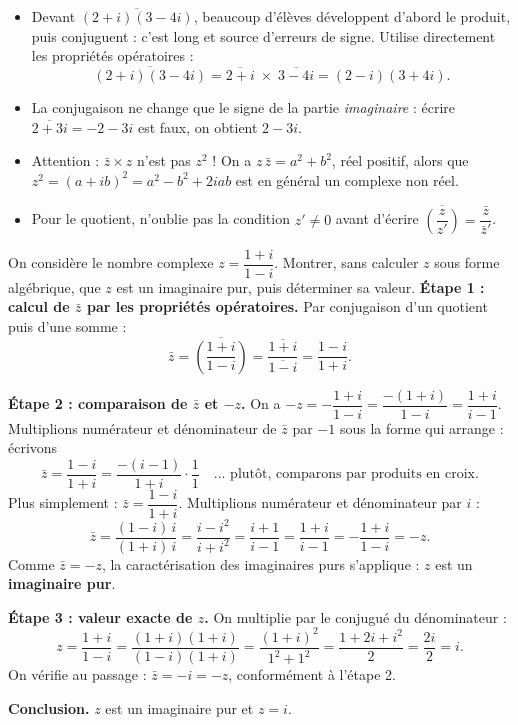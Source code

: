 \documentclass[11pt]{article}
\begin{document}
\begin{attention}
\begin{itemize}
\item Devant $\overline{(2+i)(3-4i)}$, beaucoup d'élèves développent d'abord le produit, puis conjuguent : c'est long et source d'erreurs de signe. Utilise directement les propriétés opératoires :
\[ \overline{(2+i)(3-4i)} = \overline{2+i}\;\times\;\overline{3-4i} = (2-i)(3+4i). \]
\item La conjugaison ne change que le signe de la partie \emph{imaginaire} : écrire $\overline{2+3i} = -2-3i$ est faux, on obtient $2-3i$.
\item Attention : $\bar{z} \times z$ n'est pas $z^2$ ! On a $z\,\bar{z} = a^2+b^2$, réel positif, alors que $z^2 = (a+ib)^2 = a^2 - b^2 + 2iab$ est en général un complexe non réel.
\item Pour le quotient, n'oublie pas la condition $z' \neq 0$ avant d'écrire $\overline{\left(\dfrac{z}{z'}\right)} = \dfrac{\bar{z}}{\bar{z}'}$.
\end{itemize}
\end{attention}

\begin{exoresolu}
On considère le nombre complexe $z = \dfrac{1+i}{1-i}$. Montrer, sans calculer $z$ sous forme algébrique, que $z$ est un imaginaire pur, puis déterminer sa valeur.
\tcblower
\textbf{Étape 1 : calcul de $\bar{z}$ par les propriétés opératoires.} Par conjugaison d'un quotient puis d'une somme :
\[ \bar{z} = \overline{\left(\frac{1+i}{1-i}\right)} = \frac{\overline{1+i}}{\overline{1-i}} = \frac{1-i}{1+i}. \]

\textbf{Étape 2 : comparaison de $\bar{z}$ et $-z$.} On a $-z = -\dfrac{1+i}{1-i} = \dfrac{-(1+i)}{1-i} = \dfrac{1+i}{i-1}$. Multiplions numérateur et dénominateur de $\bar{z}$ par $-1$ sous la forme qui arrange : écrivons
\[ \bar{z} = \frac{1-i}{1+i} = \frac{-(i-1)}{1+i}\cdot\frac{1}{1} \quad \text{... plutôt, comparons par produits en croix.} \]
Plus simplement : $\bar{z} = \dfrac{1-i}{1+i}$. Multiplions numérateur et dénominateur par $i$ :
\[ \bar{z} = \frac{(1-i)\,i}{(1+i)\,i} = \frac{i - i^2}{i + i^2} = \frac{i+1}{i-1} = \frac{1+i}{i-1} = -\frac{1+i}{1-i} = -z. \]
Comme $\bar{z} = -z$, la caractérisation des imaginaires purs s'applique : $z$ est un \textbf{imaginaire pur}.

\textbf{Étape 3 : valeur exacte de $z$.} On multiplie par le conjugué du dénominateur :
\[ z = \frac{1+i}{1-i} = \frac{(1+i)(1+i)}{(1-i)(1+i)} = \frac{(1+i)^2}{1^2+1^2} = \frac{1 + 2i + i^2}{2} = \frac{2i}{2} = i. \]
On vérifie au passage : $\bar{z} = -i = -z$, conformément à l'étape 2.

\textbf{Conclusion.} $z$ est un imaginaire pur et $z = i$.
\end{exoresolu}
\end{document}
